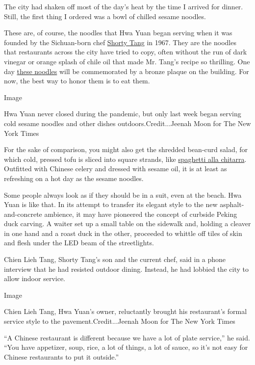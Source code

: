 The city had shaken off most of the day's heat by the time I arrived for
dinner. Still, the first thing I ordered was a bowl of chilled sesame
noodles.

These are, of course, the noodles that Hwa Yuan began serving when it
was founded by the Sichuan-born chef
\href{https://dinersjournal.blogs.nytimes3xbfgragh.onion/2010/09/30/shorty-tang-sesame-noodle-king-isremembered/}{Shorty
Tang} in 1967. They are the noodles that restaurants across the city
have tried to copy, often without the run of dark vinegar or orange
splash of chile oil that made Mr. Tang's recipe so thrilling. One day
\href{https://cooking.nytimes3xbfgragh.onion/recipes/9558-takeout-style-sesame-noodles}{these
noodles} will be commemorated by a bronze plaque on the building. For
now, the best way to honor them is to eat them.

Image

Hwa Yuan never closed during the pandemic, but only last week began
serving cold sesame noodles and other dishes outdoors.Credit...Jeenah
Moon for The New York Times

For the sake of comparison, you might also get the shredded bean-curd
salad, for which cold, pressed tofu is sliced into square strands, like
\href{https://www.nytimes3xbfgragh.onion/2004/05/26/dining/a-guitar-that-makes-beautiful-pasta.html}{spaghetti
alla chitarra}. Outfitted with Chinese celery and dressed with sesame
oil, it is at least as refreshing on a hot day as the sesame noodles.

Some people always look as if they should be in a suit, even at the
beach. Hwa Yuan is like that. In its attempt to transfer its elegant
style to the new asphalt-and-concrete ambience, it may have pioneered
the concept of curbside Peking duck carving. A waiter set up a small
table on the sidewalk and, holding a cleaver in one hand and a roast
duck in the other, proceeded to whittle off tiles of skin and flesh
under the LED beam of the streetlights.

Chien Lieh Tang, Shorty Tang's son and the current chef, said in a phone
interview that he had resisted outdoor dining. Instead, he had lobbied
the city to allow indoor service.

Image

Chien Lieh Tang, Hwa Yuan's owner, reluctantly brought his restaurant's
formal service style to the pavement.Credit...Jeenah Moon for The New
York Times

``A Chinese restaurant is different because we have a lot of plate
service,'' he said. ``You have appetizer, soup, rice, a lot of things, a
lot of sauce, so it's not easy for Chinese restaurants to put it
outside.''

